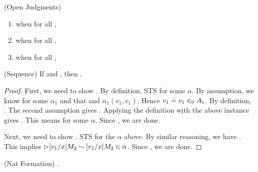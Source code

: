 \begin{definition}(Open Judgments)
  \begin{enumerate}
    \item {} when for all , 
    \item {} when for all , 
    \item {} when for all , 
  \end{enumerate}
\end{definition}

\begin{lemma}(Sequence)
  If  and , then 
  .
\end{lemma}

\begin{proof}
  First, we need to show .
  By definition, STS  for some $\alpha$. 
  By assumption, we know  for some $\alpha_1$ and 
  that  and $\alpha_1(v_1,v_1)$. Hence $v_1 \doteq v_1 \in_0 A_1$.
  By definition, .
  The second assumption gives . 
  Applying the definition with the above instance gives 
  . This means 
  for some $\alpha$. Since
  , we are done.

  Next, we need to show .
  STS  for the $\alpha$
  above. By similar reasoning, we have .
  This implies $ \rhd [v_1/x]M_2 \sim [v_1/x]M_2 \in \alpha$.
  Since , we are done.
\end{proof}

\begin{lemma}(Nat Formation)
  \eqType{\nat}{\nat}.
\end{lemma}

